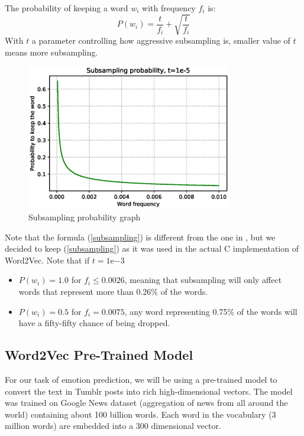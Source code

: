 The probability of keeping a word $w_i$ with frequency $f_i$ is:
\begin{equation}
    P(w_i) = \frac{t}{f_i} + \sqrt{\frac{t}{f_i}}
    \label{subsampling}
\end{equation}
With $t$ a parameter controlling how aggressive subsampling is, smaller value of $t$ means more subsampling. 

\begin{figure}[H]
    \centering
    \includegraphics[width=0.8\textwidth]{Images/subsampling_prob.eps}
    \caption{Subsampling probability graph}
\end{figure}

Note that the formula (\ref{subsampling}) is different from the one in \cite{word2vec2}, but we decided to keep (\ref{subsampling}) as it was used in the actual C implementation of Word2Vec. Note that if $t=1\mathrm{e}{-3}$
\begin{itemize}
    \item $P(w_i) = 1.0$ for $f_i\leq0.0026$, meaning that subsampling will only affect words that represent more than 0.26\% of the words.
    \item $P(w_i) = 0.5$ for $f_i=0.0075$, any word representing 0.75\% of the words will have a fifty-fifty chance of being dropped.
\end{itemize}

\subsection{Word2Vec Pre-Trained Model}

For our task of emotion prediction, we will be using a pre-trained model to convert the text in Tumblr posts into rich high-dimensional vectors. The model was trained on Google News dataset (aggregation of news from all around the world) containing about 100 billion words. Each word in the vocabulary (3 million words) are embedded into a 300 dimensional vector. 

